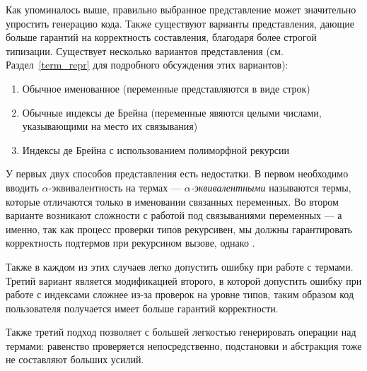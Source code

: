 Как упоминалось выше, правильно выбранное представление может значительно упростить генерацию кода. Также существуют варианты представления, дающие больше гарантий на корректность составления, благодаря более строгой типизации. Существует несколько вариантов представления (см. Раздел~\ref{term_repr} для подробного обсуждения этих вариантов):
\begin{enumerate}
\item Обычное именованное (переменные представляются в виде строк)
\item Обычные индексы де Брейна\cite{de_brujin} (переменные явяются целыми числами, указывающими на место их связывания)
\item Индексы де Брейна с использованием полиморфной рекурсии\cite{poly_rec}
\end{enumerate}

У первых двух способов представления есть недостатки. В первом необходимо вводить $\alpha$-эквивалентность на термах --- \textit{$\alpha$-эквивалентными} называются термы, которые отличаются только в именовании связанных переменных. Во втором варианте возникают сложности с работой под связываниями переменных --- а именно, так как процесс проверки типов рекурсивен, мы должны гарантировать корректность подтермов при рекурсином вызове, однако .

Также в каждом из этих случаев легко допустить ошибку при работе с термами. Третий вариант является модификацией второго, в которой допустить ошибку при работе с индексами сложнее из-за проверок на уровне типов, таким образом код пользователя получается имеет больше гарантий корректности.

Также третий подход позволяет с большей легкостью генерировать операции над термами: равенство проверяется непосредственно, подстановки и абстракция тоже не составляют больших усилий.





